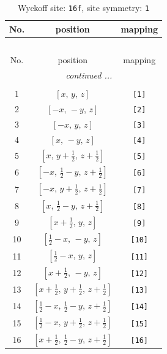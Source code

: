 \documentclass[fleqn,8pt]{jsarticle}
\begin{document}
\begin{longtable}{ccc}
\caption{Wyckoff site: {\tt 16f}, site symmetry: {\tt 1}}
 \\
 \hline \hline
No. & position & mapping \\ \hline \endfirsthead

\multicolumn{2}{l}{\tablename\ \thetable{}} \\
 \hline \hline
No. & position & mapping \\ \hline \endhead

 \hline \hline
\multicolumn{2}{r}{\footnotesize\it continued ...} \\ \endfoot

 \hline \hline
\multicolumn{2}{r}{} \\ \endlastfoot

1 & $\left[ x,\, y,\, z \right]$ & {\tt [1]} \\ \hline
2 & $\left[ - x,\, - y,\, z \right]$ & {\tt [2]} \\ \hline
3 & $\left[ - x,\, y,\, z \right]$ & {\tt [3]} \\ \hline
4 & $\left[ x,\, - y,\, z \right]$ & {\tt [4]} \\ \hline
5 & $\left[ x,\, y + \frac{1}{2},\, z + \frac{1}{2} \right]$ & {\tt [5]} \\ \hline
6 & $\left[ - x,\, \frac{1}{2} - y,\, z + \frac{1}{2} \right]$ & {\tt [6]} \\ \hline
7 & $\left[ - x,\, y + \frac{1}{2},\, z + \frac{1}{2} \right]$ & {\tt [7]} \\ \hline
8 & $\left[ x,\, \frac{1}{2} - y,\, z + \frac{1}{2} \right]$ & {\tt [8]} \\ \hline
9 & $\left[ x + \frac{1}{2},\, y,\, z \right]$ & {\tt [9]} \\ \hline
10 & $\left[ \frac{1}{2} - x,\, - y,\, z \right]$ & {\tt [10]} \\ \hline
11 & $\left[ \frac{1}{2} - x,\, y,\, z \right]$ & {\tt [11]} \\ \hline
12 & $\left[ x + \frac{1}{2},\, - y,\, z \right]$ & {\tt [12]} \\ \hline
13 & $\left[ x + \frac{1}{2},\, y + \frac{1}{2},\, z + \frac{1}{2} \right]$ & {\tt [13]} \\ \hline
14 & $\left[ \frac{1}{2} - x,\, \frac{1}{2} - y,\, z + \frac{1}{2} \right]$ & {\tt [14]} \\ \hline
15 & $\left[ \frac{1}{2} - x,\, y + \frac{1}{2},\, z + \frac{1}{2} \right]$ & {\tt [15]} \\ \hline
16 & $\left[ x + \frac{1}{2},\, \frac{1}{2} - y,\, z + \frac{1}{2} \right]$ & {\tt [16]} \\
\end{longtable}
\end{document}
